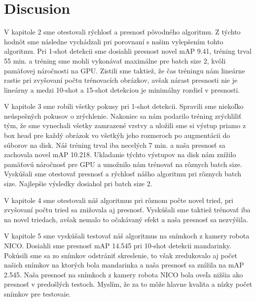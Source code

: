 \chapter{Discusion}\label{chap:discusion}
V kapitole 2 sme otestovali rýchlosť a presnosť pôvodného algoritmu. Z týchto hodnôt sme následne vychádzali pri porovnaní s našim vylepšením tohto algoritmu. Pri 1-shot detekcii sme dosiahli presnost novel mAP 9.41, tréning trval 55 min. a tréning sme mohli vykonávať maximálne pre batch size 2, kvôli pamäťovej náročnosti na GPU. Zistili sme taktiež, že čas tréningu nám lineárne rastie pri zvyšovaní počtu trénovacích obrázkov, avšak nárast presnosti nie je lineárny a medzi 10-shot a 15-shot detekciou je minimálny rozdiel v presnosti.  

V kapitole 3 sme robili všetky pokusy pri 1-shot detekcii. Spravili sme niekoľko neúspešných pokusov o zrýchlenie. Nakoniec sa nám podarilo tréning  zrýchliliť tým, že sme vynechali všetky zamrazené vrstvy a uložili sme si výstup priamo z box head pre každý obrázok vo všetkýh jeho rozmeroch po augmentácii do súborov na disk. Náš tréning trval iba necelých 7 min. a naša presnosť sa zachovala novel mAP 10.218. Ukladanie týchto výstupov na disk nám znížilo pamäťovú náročnosť pre GPU a umožnilo nám trénovať na rôznych batch size. Vyskúšali sme otestovať presnosť a rýchlosť nášho algoritmu pri rôznych batch size. Najlepšie výsledky dosiahol pri batch size 2. 

V kapitole 4 sme otestovali náš algoritmus pri rôznom počte novel tried, pri zvyšovaní počtu tried sa znižovala aj presnosť. Vyskúšali sme taktiež trénovať iba na novel triedach, avšak nemalo to očakávaný efekt a naša presnosť sa nezvýšila.

V kapitole 5 sme vyskúšali testovať náš algoritmus na snímkoch z kamery robota NICO. Dosiahli sme presnosť mAP 14.545 pri 10-shot detekcii mandarinky. Pokúsili sme sa zo snímkov odstrániť skreslenie, to však zredukovalo aj počet našich snímkov na ktorých bola mandarinka a naša presnosť sa znížila na mAP 2.545. Naša presnosť na snímkoch z kamery robota NICO bola oveľa nižšia ako presnosť v predošlých testoch. Myslím, že za to môže hlavne kvalita a nízky počet snímkov pre testovaie.